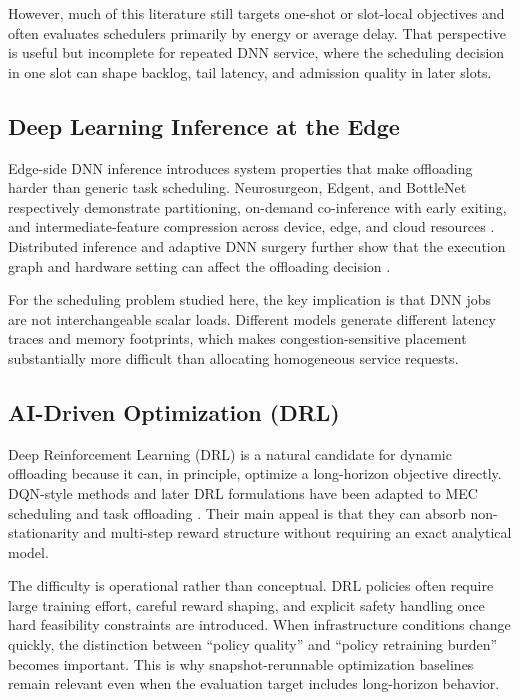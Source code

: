 However, much of this literature still targets one-shot or slot-local objectives and often evaluates schedulers primarily by energy or average delay. That perspective is useful but incomplete for repeated DNN service, where the scheduling decision in one slot can shape backlog, tail latency, and admission quality in later slots.

\subsection{Deep Learning Inference at the Edge}
Edge-side DNN inference introduces system properties that make offloading harder than generic task scheduling. Neurosurgeon, Edgent, and BottleNet respectively demonstrate partitioning, on-demand co-inference with early exiting, and intermediate-feature compression across device, edge, and cloud resources \cite{Kang2017, Li2018, Eshratifar2019}. Distributed inference and adaptive DNN surgery further show that the execution graph and hardware setting can affect the offloading decision \cite{Teerapittayanon2017, Hu2019DNNsurgery}.

For the scheduling problem studied here, the key implication is that DNN jobs are not interchangeable scalar loads. Different models generate different latency traces and memory footprints, which makes congestion-sensitive placement substantially more difficult than allocating homogeneous service requests.

\subsection{AI-Driven Optimization (DRL)}
Deep Reinforcement Learning (DRL) is a natural candidate for dynamic offloading because it can, in principle, optimize a long-horizon objective directly. DQN-style methods \cite{Mnih2015} and later DRL formulations have been adapted to MEC scheduling and task offloading \cite{Huang2020, Tang2022}. Their main appeal is that they can absorb non-stationarity and multi-step reward structure without requiring an exact analytical model.

The difficulty is operational rather than conceptual. DRL policies often require large training effort, careful reward shaping, and explicit safety handling once hard feasibility constraints are introduced. When infrastructure conditions change quickly, the distinction between ``policy quality'' and ``policy retraining burden'' becomes important. This is why snapshot-rerunnable optimization baselines remain relevant even when the evaluation target includes long-horizon behavior.

